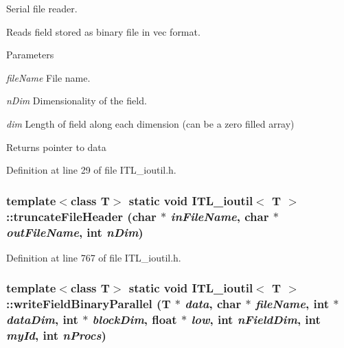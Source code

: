 Serial file reader. 

Reads field stored as binary file in vec format. 
\begin{DoxyParams}{Parameters}
\item[{\em fileName}]File name. \item[{\em nDim}]Dimensionality of the field. \item[{\em dim}]Length of field along each dimension (can be a zero filled array) \end{DoxyParams}
\begin{DoxyReturn}{Returns}
pointer to data 
\end{DoxyReturn}


Definition at line 29 of file ITL\_\-ioutil.h.

\hypertarget{classITL__ioutil_a26e23f265abc129fc517b80197f07893}{
\subsubsection[{truncateFileHeader}]{\setlength{\rightskip}{0pt plus 5cm}template$<$class T$>$ static void {\bf ITL\_\-ioutil}$<$ T $>$::truncateFileHeader (char $\ast$ {\em inFileName}, \/  char $\ast$ {\em outFileName}, \/  int {\em nDim})}}
\label{classITL__ioutil_a26e23f265abc129fc517b80197f07893}


Definition at line 767 of file ITL\_\-ioutil.h.

\hypertarget{classITL__ioutil_afec3a839fe31a416641c5e0ad2dc4669}{
\subsubsection[{writeFieldBinaryParallel}]{\setlength{\rightskip}{0pt plus 5cm}template$<$class T$>$ static void {\bf ITL\_\-ioutil}$<$ T $>$::writeFieldBinaryParallel (T $\ast$ {\em data}, \/  char $\ast$ {\em fileName}, \/  int $\ast$ {\em dataDim}, \/  int $\ast$ {\em blockDim}, \/  float $\ast$ {\em low}, \/  int {\em nFieldDim}, \/  int {\em myId}, \/  int {\em nProcs})}}
\label{classITL__ioutil_afec3a839fe31a416641c5e0ad2dc4669}


